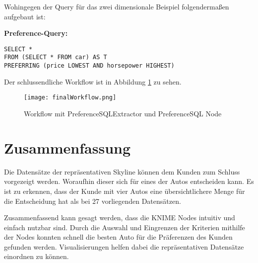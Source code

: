 Wohingegen der Query für das zwei dimensionale Beispiel folgendermaßen aufgebaut ist:

\textbf{Preference-Query:}
\begin{lstlisting}
SELECT * 
FROM (SELECT * FROM car) AS T 
PREFERRING (price LOWEST AND horsepower HIGHEST)
\end{lstlisting}

Der schlussendliche Workflow ist in Abbildung \ref{img:finalWorkflow} zu sehen. 
 
\begin{figure}[H]
	\centering
	\texttt{[image: finalWorkflow.png]}
	\caption{Workflow mit PreferenceSQLExtractor und PreferenceSQL Node}
	\label{img:finalWorkflow}
\end{figure} 
\section{Zusammenfassung}
\label{ch:Evaluierung:sec:zusammenfassung}
Die Datensätze der repräsentativen Skyline können dem Kunden zum Schluss vorgezeigt werden. Woraufhin dieser sich für eines der Autos entscheiden kann. Es ist zu erkennen, dass der Kunde mit vier Autos eine übersichtlichere Menge für die Entscheidung hat als bei 27 vorliegenden Datensätzen.

Zusammenfassend kann gesagt werden, dass die KNIME Nodes intuitiv und einfach nutzbar sind. Durch die Auswahl und Eingrenzen der Kriterien mithilfe der Nodes konnten schnell die besten Auto für die Präferenzen des Kunden gefunden werden. Visualisierungen helfen dabei die repräsentativen Datensätze einordnen zu können. 
